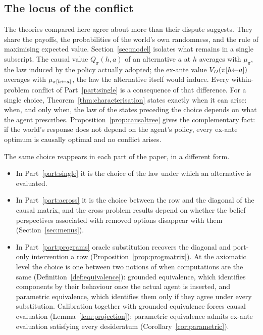 \subsection{The locus of the conflict}\label{sec:disc-locus}

The theories compared here agree about more than their dispute suggests. They share the payoffs,
the probabilities of the world's own randomness, and the rule of maximising expected value.
Section~\ref{sec:model} isolates what remains in a single subscript. The causal value
$Q_\pi(h,a)$ of an alternative $a$ at $h$ averages with $\mu_\pi$, the law induced by the policy
actually adopted; the ex-ante value $V_D(\pi[h{\leftarrow}a])$ averages with $\mu_{\pi[h{\leftarrow}a]}$, the
law the alternative itself would induce. Every within-problem conflict of Part~\ref{part:single} is a
consequence of that difference. For a single choice, Theorem~\ref{thm:characterisation} states
exactly when it can arise: when, and only when, the law of the states preceding the choice depends on
what the agent prescribes. Proposition~\ref{prop:causaltree} gives the complementary fact: if the
world's response does not depend on the agent's policy, every ex-ante optimum is causally optimal
and no conflict arises.

The same choice reappears in each part of the paper, in a different form.
\begin{itemize}
  \item In Part~\ref{part:single} it is the choice of the law under which an alternative is
        evaluated.
  \item In Part~\ref{part:across} it is the choice between the row and the diagonal of the causal
        matrix, and the cross-problem results depend on whether the belief perspectives associated
        with removed options disappear with them (Section~\ref{sec:menus}).
  \item In Part~\ref{part:programs} oracle substitution recovers the diagonal and port-only
        intervention a row (Proposition~\ref{prop:progmatrix}). At the axiomatic level the choice is
        one between two notions of when computations are the same
        (Definition~\ref{def:equivalence}): grounded equivalence, which identifies components by
        their behaviour once the actual agent is inserted, and parametric equivalence, which
        identifies them only if they agree under every substitution. Calibration together with
        grounded equivalence forces causal evaluation (Lemma~\ref{lem:projection}); parametric
        equivalence admits ex-ante evaluation satisfying every desideratum
        (Corollary~\ref{cor:parametric}).
\end{itemize}

